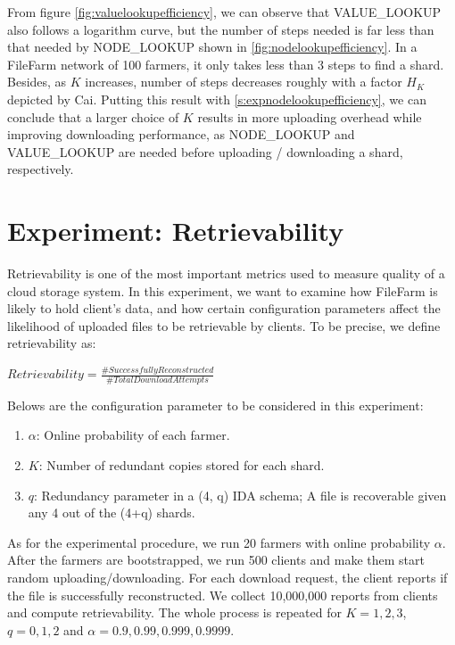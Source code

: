 From figure \ref{fig:valuelookupefficiency}, we can observe that VALUE\_LOOKUP also follows a logarithm curve, but the number of steps needed is far less than that needed by NODE\_LOOKUP shown in \ref{fig:nodelookupefficiency}. In a FileFarm network of 100 farmers, it only takes less than 3 steps to find a shard. Besides, as $K$ increases, number of steps decreases roughly with a factor $H_{K}$ depicted by Cai\cite{cai2013probabilistic}. Putting this result with \ref{s:expnodelookupefficiency}, we can conclude that a larger choice of $K$ results in more uploading overhead while improving downloading performance, as NODE\_LOOKUP and VALUE\_LOOKUP are needed before uploading / downloading a shard, respectively.

\section{Experiment: Retrievability}
\label{s:expretrievability}

Retrievability is one of the most important metrics used to measure quality of a cloud storage system. In this experiment, we want to examine how FileFarm is likely to hold client's data, and how certain configuration parameters affect the likelihood of uploaded files to be retrievable by clients. To be precise, we define retrievability as:

\begin{center}
  $Retrievability = \frac{\# Successfully Reconstructed}{\# Total Download Attempts}$
\end{center}

\noindent Belows are the configuration parameter to be considered in this experiment:

\begin{enumerate}
  \item $\alpha$: Online probability of each farmer.
  \item $K$: Number of redundant copies stored for each shard.
  \item $q$: Redundancy parameter in a (4, q) IDA schema; A file is recoverable given any 4 out of the (4+q) shards.
\end{enumerate}

As for the experimental procedure, we run 20 farmers with online probability $\alpha$. After the farmers are bootstrapped, we run 500 clients and make them start random uploading/downloading. For each download request, the client reports if the file is successfully reconstructed. We collect 10,000,000 reports from clients and compute retrievability. The whole process is repeated for $K=1,2,3$, $q=0,1,2$ and $\alpha=0.9,0.99,0.999,0.9999$.

